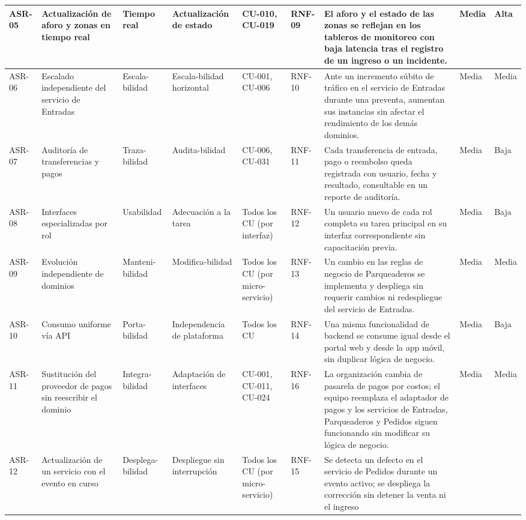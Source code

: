\documentclass[11pt,a4paper]{article}
\begin{document}
\begin{landscape}
\begin{center}
\begin{longtable}{|p{1cm}|p{2.9cm}|p{2.1cm}|p{2.3cm}|p{1.7cm}|p{1.5cm}|p{6.1cm}|p{1.4cm}|p{1.4cm}|}
\hline
ASR-05 & Actualización de aforo y zonas en tiempo real & Tiempo real & Actualización de estado &
CU-010, CU-019 & RNF-09 & El aforo y el estado de las zonas se reflejan en los tableros de
monitoreo con baja latencia tras el registro de un ingreso o un incidente. & Media & Alta\\
\hline
ASR-06 & Escalado independiente del servicio de Entradas & Escala-bilidad & Escala-bilidad
horizontal & CU-001, CU-006 & RNF-10 & Ante un incremento súbito de tráfico en el servicio de
Entradas durante una preventa, aumentan sus instancias sin afectar el rendimiento de los demás
dominios. & Media & Media\\
\hline
ASR-07 & Auditoría de transferencias y pagos & Traza-bilidad & Audita-bilidad & CU-006, CU-031 &
RNF-11 & Cada transferencia de entrada, pago o reembolso queda registrada con usuario, fecha y
resultado, consultable en un reporte de auditoría. & Media & Baja\\
\hline
ASR-08 & Interfaces especializadas por rol & Usabilidad & Adecuación a la tarea & Todos los CU
(por interfaz) & RNF-12 & Un usuario nuevo de cada rol completa su tarea principal en su interfaz
correspondiente sin capacitación previa. & Media & Baja\\
\hline
ASR-09 & Evolución independiente de dominios & Manteni-bilidad & Modifica-bilidad & Todos los CU
(por micro-servicio) & RNF-13 & Un cambio en las reglas de negocio de Parqueaderos se implementa y
despliega sin requerir cambios ni redespliegue del servicio de Entradas. & Media & Media\\
\hline
ASR-10 & Consumo uniforme vía API & Porta-bilidad & Independencia de plataforma & Todos los CU &
RNF-14 & Una misma funcionalidad de backend se consume igual desde el portal web y desde la app
móvil, sin duplicar lógica de negocio. & Media & Baja\\
\hline
ASR-11 & Sustitución del proveedor de pagos sin reescribir el dominio & Integra-bilidad &
Adaptación de interfaces & CU-001, CU-011, CU-024 & RNF-16 & La organización cambia de pasarela de
pagos por costos; el equipo reemplaza el adaptador de pagos y los servicios de Entradas,
Parqueaderos y Pedidos siguen funcionando sin modificar su lógica de negocio. & Media & Media\\
\hline
ASR-12 & Actualización de un servicio con el evento en curso & Desplega-bilidad & Despliegue sin
interrupción & Todos los CU (por micro-servicio) & RNF-15 & Se detecta un defecto en el servicio
de Pedidos durante un evento activo; se despliega la corrección sin detener la venta ni el ingreso

\end{longtable}
\end{center}
\end{landscape}
\end{document}
